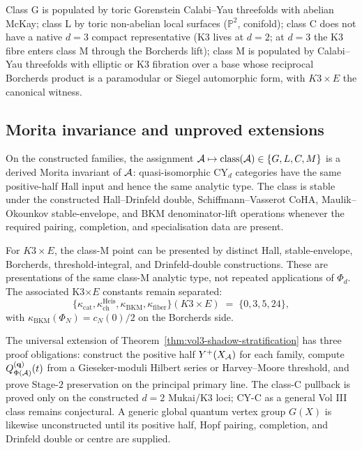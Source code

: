 \begin{remark}[Examples at $d = 3$]
\label{rem:vol3-shadow-d3-examples}
Class G is populated by toric Gorenstein Calabi--Yau threefolds with
abelian McKay; class L by toric non-abelian local surfaces ($\mathbb P^{2}$,
conifold); class C does not have a native $d = 3$ compact representative
(K3 lives at $d = 2$; at $d = 3$ the K3 fibre enters class M through
the Borcherds lift); class M is populated by Calabi--Yau threefolds
with elliptic or K3 fibration over a base whose reciprocal Borcherds
product is a paramodular or Siegel automorphic form, with $K3 \times E$
the canonical witness.
\end{remark}

\subsection{Morita invariance and unproved extensions}
\label{subsec:vol3-shadow-obligations}

On the constructed families, the assignment
$\mathcal{A} \mapsto \mathrm{class}(\mathcal{A}) \in \{G, L, C, M\}$ is a derived
Morita invariant of $\mathcal{A}$: quasi-isomorphic CY$_d$ categories have the
same positive-half Hall input and hence the same analytic type. The
class is stable under the constructed Hall--Drinfeld double,
Schiffmann--Vasserot CoHA, Maulik--Okounkov stable-envelope, and BKM
denominator-lift operations whenever the required pairing, completion,
and specialisation data are present.

For $K3 \times E$, the class-M point can be presented by distinct
Hall, stable-envelope, Borcherds, threshold-integral, and
Drinfeld-double constructions. These are presentations of the same
class-M analytic type, not repeated applications of $\Phi_d$. The
associated K3$\times E$ constants remain separated:
\[
  \{\kappa_{\mathrm{cat}},\kappa_{\mathrm{ch}}^{\mathrm{Heis}},
    \kappa_{\mathrm{BKM}},\kappa_{\mathrm{fiber}}\}(K3\times E)
  \;=\; \{0,3,5,24\},
\]
with $\kappa_{\mathrm{BKM}}(\Phi_N)=c_N(0)/2$ on the Borcherds side.

The universal extension of Theorem~\ref{thm:vol3-shadow-stratification}
has three proof obligations: construct the positive half
$Y^{+}(X_{\mathcal{A}})$ for each family, compute
$Q^{(\mathbf q)}_{\Phi(\mathcal{A})}(t)$ from a Gieseker-moduli Hilbert series
or Harvey--Moore threshold, and prove Stage-$2$ preservation on the
principal primary line. The class-C pullback is proved only on the
constructed $d=2$ Mukai/K3 loci; CY-C as a general Vol III class remains
conjectural. A generic global quantum vertex group $G(X)$ is likewise
unconstructed until its positive half, Hopf pairing, completion, and
Drinfeld double or centre are supplied.
